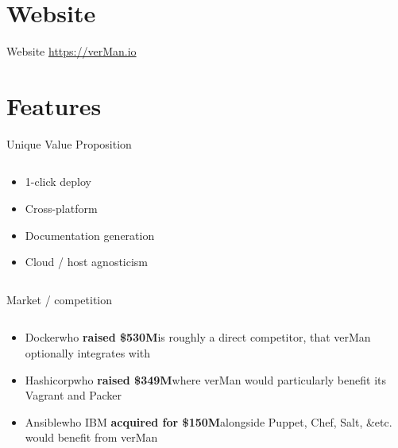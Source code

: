 \documentclass[aspectratio=169]{beamer}
\begin{document}
\section{Website}
\begin{frame}{Website}
    \centering
    \Large
    \href{https://verMan.io}{https://verMan.io}
\end{frame}

\section{Features}

\begin{frame}{Unique Value Proposition}
        \begin{columns}
            \begin{column}{0.5\textwidth}
        
  \begin{tvWindow}[UVP]
    \begin{itemize}[<+->]
      \item 1-click deploy
      \item Cross-platform
      \item Documentation generation
      \item Cloud / host agnosticism
    \end{itemize}
  \end{tvWindow}
\end{column}
\end{columns}
\end{frame}


\begin{frame}{Market / competition}
    \begin{columns}
        \begin{column}{0.617\textwidth}
    
\begin{itemize}[<+->]
    \item Docker\textemdash{}who \textbf{raised \$530M}\textemdash{}is roughly a direct competitor, that verMan optionally integrates with
    \item Hashicorp\textemdash{}who \textbf{raised \$349M}\textemdash{}where verMan would particularly benefit its Vagrant and Packer
    \item Ansible\textemdash{}who IBM \textbf{acquired for \$150M}\textemdash{}alongside Puppet, Chef, Salt, \&etc. would benefit from verMan
\end{itemize}
\end{column}
\end{columns}
\end{frame}
\end{document}
